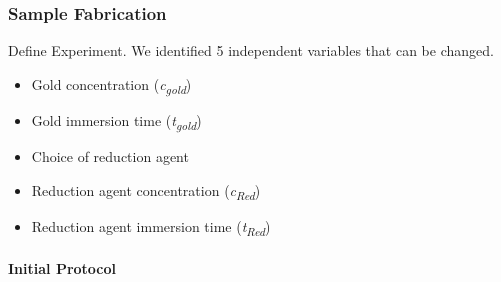 \subsubsection{Sample Fabrication}
\label{subsec:SampleFab}

Define Experiment. We identified 5 independent variables that can be changed.


\begin{multicols}{2}
\begin{itemize}
    \item Gold concentration (\textit{c\textsubscript{gold}})
    \item Gold immersion time (\textit{t\textsubscript{gold}})
    \item Choice of reduction agent
    \item Reduction agent concentration (\textit{c\textsubscript{Red}})
    \item Reduction agent immersion time (\textit{t\textsubscript{Red}})
\end{itemize}
\end{multicols}




\paragraph{Initial Protocol}

